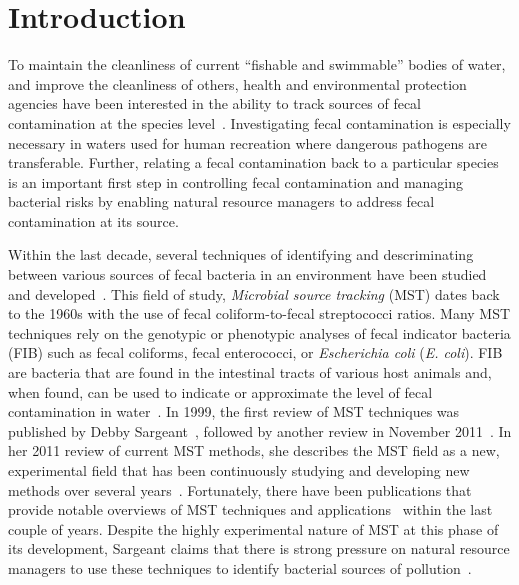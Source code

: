 \documentclass[12pt]{ucthesis}
\begin{document}
\pagestyle{plain}

\renewcommand{\baselinestretch}{1.66}


\chapter{Introduction}\label{chap:intro}
   To maintain the cleanliness of current ``fishable and swimmable'' bodies of
   water, and improve the cleanliness of others, health and environmental
   protection agencies have been interested in the ability to track sources of
   fecal contamination at the species level~\cite{Scott:CurrentMST,
   Simpson:StateOf, Desmarais:SoilInfluence}. Investigating fecal contamination
   is especially necessary in waters used for human recreation where dangerous
   pathogens are transferable. Further, relating a fecal contamination back to
   a particular species is an important first step in controlling fecal
   contamination and managing bacterial risks by enabling natural resource
   managers to address fecal contamination at its source.

   Within the last decade, several techniques of identifying and descriminating
   between various sources of fecal bacteria in an environment have been
   studied and developed~\cite{Sargeant:ReviewMST, Hagedorn:MST_TMDL,
   Lowe:FocusMST, Rivera:MSTCharacterization, Cornelison:MSTTools,
   Chase:FloridaMST}. This field of study, \textit{Microbial source tracking}
   (MST) dates back to the 1960s with the use of fecal coliform-to-fecal
   streptococci ratios. Many MST techniques rely on the genotypic or
   phenotypic analyses of fecal indicator bacteria (FIB) such as fecal
   coliforms, fecal enterococci, or \textit{Escherichia coli} (\textit{E.
   coli}). FIB are bacteria that are found in the intestinal tracts of various
   host animals and, when found, can be used to indicate or approximate the
   level of fecal contamination in water~\cite{Simpson:StateOf}. In 1999, the
   first review of MST techniques was published by Debby
   Sargeant~\cite{Sargeant:Methods}, followed by another review in November
   2011~\cite{Sargeant:ReviewMST}. In her 2011 review of current MST methods,
   she describes the MST field as a new, experimental field that has been
   continuously studying and developing new methods over several
   years~\cite{Sargeant:ReviewMST}. Fortunately, there have been publications
   that provide notable overviews of MST techniques and
   applications~\cite{Hagedorn:CaseStudies, Domingo:Current,
   Harwood:RapidMethods} within the last couple of years. Despite the highly
   experimental nature of MST at this phase of its development, Sargeant claims
   that there is strong pressure on natural resource managers to use these
   techniques to identify bacterial sources of
   pollution~\cite{Sargeant:ReviewMST}.
\end{document}
